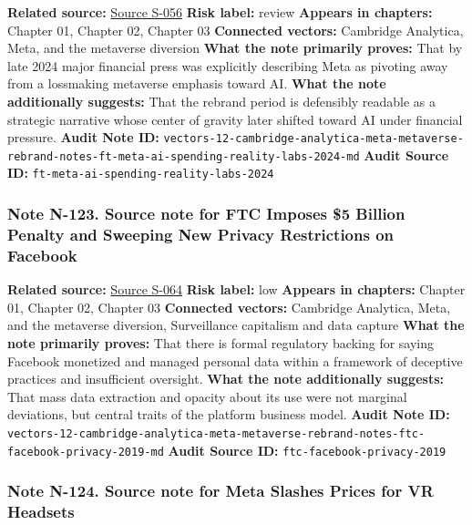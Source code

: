 \documentclass[
  american,
  11pt,
  letterpaper,
]{article}
\begin{document}
\textbf{Related source:}
\hyperref[source-s-056-meta-sees-ai-spending-accelerating-as-earnings-top-forecasts]{Source
S-056} \textbf{Risk label:} review \textbf{Appears in chapters:} Chapter
01, Chapter 02, Chapter 03 \textbf{Connected vectors:} Cambridge
Analytica, Meta, and the metaverse diversion \textbf{What the note
primarily proves:} That by late 2024 major financial press was
explicitly describing Meta as pivoting away from a lossmaking metaverse
emphasis toward AI. \textbf{What the note additionally suggests:} That
the rebrand period is defensibly readable as a strategic narrative whose
center of gravity later shifted toward AI under financial pressure.
\textbf{Audit Note ID:}
\texttt{vectors-12-cambridge-analytica-meta-metaverse-rebrand-notes-ft-meta-ai-spending-reality-labs-2024-md}
\textbf{Audit Source ID:} \texttt{ft-meta-ai-spending-reality-labs-2024}

\subsubsection{Note N-123. Source note for FTC Imposes \$5 Billion
Penalty and Sweeping New Privacy Restrictions on
Facebook}\label{note-n-123-vectors-12-cambridge-analytica-meta-metaverse-rebrand-notes-ftc-facebook-privacy-2019-md}

\textbf{Related source:}
\hyperref[source-s-064-ftc-imposes-5-billion-penalty-and-sweeping-new-privacy-restrictions-on-facebook]{Source
S-064} \textbf{Risk label:} low \textbf{Appears in chapters:} Chapter
01, Chapter 02, Chapter 03 \textbf{Connected vectors:} Cambridge
Analytica, Meta, and the metaverse diversion, Surveillance capitalism
and data capture \textbf{What the note primarily proves:} That there is
formal regulatory backing for saying Facebook monetized and managed
personal data within a framework of deceptive practices and insufficient
oversight. \textbf{What the note additionally suggests:} That mass data
extraction and opacity about its use were not marginal deviations, but
central traits of the platform business model. \textbf{Audit Note ID:}
\texttt{vectors-12-cambridge-analytica-meta-metaverse-rebrand-notes-ftc-facebook-privacy-2019-md}
\textbf{Audit Source ID:} \texttt{ftc-facebook-privacy-2019}

\subsubsection{Note N-124. Source note for Meta Slashes Prices for VR
Headsets}\label{note-n-124-vectors-12-cambridge-analytica-meta-metaverse-rebrand-notes-investopedia-meta-vr-price-cuts-2023-md}
\end{document}
